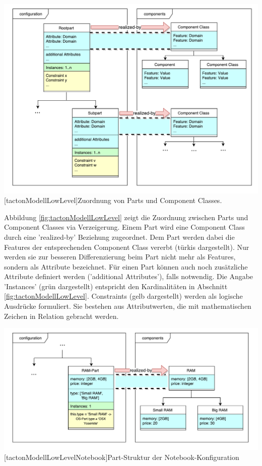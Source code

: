 \documentclass[11pt, a4paper, titlepage, listof=totoc, bibliography=totoc, index=totoc, twoside, openright, headings=normal]{scrreprt}
\begin{document}
\vspace{1em}
\begin{minipage}{\linewidth}
	\centering
	\includegraphics[width=1\linewidth]{Abbildungen/tactonModellLowLevel.pdf}
	[tactonModellLowLevel]{Zuordnung von Parts und Component Classes.}
	\label{fig:tactonModellLowLevel}
\end{minipage}
\vspace{1em}

Abbildung \ref{fig:tactonModellLowLevel} zeigt die Zuordnung zwischen Parts und Component Classes via Verzeigerung. Einem Part wird eine Component Class durch eine 'realized-by' Beziehung zugeordnet. Dem Part werden dabei die Features der entsprechenden Component Class vererbt (türkis dargestellt). Nur werden sie zur besseren Differenzierung beim Part nicht mehr als Features, sondern als Attribute bezeichnet. Für einen Part können auch noch zusätzliche Attribute definiert werden ('additional Attributes'), falls notwendig. Die Angabe 'Instances' (grün dargestellt) entspricht den Kardinalitäten in Abschnitt \ref{fig:tactonModellLowLevel}. Constraints (gelb dargestellt) werden als logische Ausdrücke formuliert. Sie bestehen aus Attributwerten, die mit mathematischen Zeichen in Relation gebracht werden.

\vspace{1em}
\begin{minipage}{\linewidth}
	\centering
	\includegraphics[width=1\linewidth]{Abbildungen/tactonModellLowLevelNotebook.pdf}
	[tactonModellLowLevelNotebook]{Part-Struktur der Notebook-Konfiguration}
	\label{fig:tactonModellLowLevelNotebook}
\end{minipage}
\vspace{1em}
\end{document}
